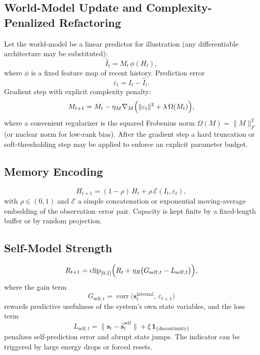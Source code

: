 \documentclass[11pt,a4paper]{article}
\begin{document}
\subsection{World-Model Update and Complexity-Penalized Refactoring}

Let the world-model be a linear predictor for illustration (any differentiable architecture may be substituted):
\begin{equation}
  \widehat{I}_t = M_t\, \phi(H_t),
\end{equation}
where \(\phi\) is a fixed feature map of recent history. Prediction error
\begin{equation}
  \varepsilon_t = I_t - \widehat{I}_t.
\end{equation}
Gradient step with explicit complexity penalty:
\begin{equation}
  M_{t+1} = M_t - \eta_M \nabla_M\Bigl( \|\varepsilon_t\|^2 + \lambda\, \Omega(M_t) \Bigr),
  \label{eq:model}
\end{equation}
where a convenient regularizer is the squared Frobenius norm \(\Omega(M) = \|M\|_F^2\) (or nuclear norm for low-rank bias). After the gradient step a hard truncation or soft-thresholding step may be applied to enforce an explicit parameter budget.

\subsection{Memory Encoding}

\begin{equation}
  H_{t+1} = (1-\rho)\, H_t + \rho\, \mathcal{E}(I_t,\varepsilon_t),
  \label{eq:mem}
\end{equation}
with \(\rho \in (0,1)\) and \(\mathcal{E}\) a simple concatenation or exponential moving-average embedding of the observation--error pair. Capacity is kept finite by a fixed-length buffer or by random projection.

\subsection{Self-Model Strength}

\begin{equation}
  R_{t+1} = \operatorname{clip}_{[0,1]}\Bigl(
    R_t + \eta_R\bigl( G_{\mathrm{self},t} - L_{\mathrm{self},t} \bigr)
  \Bigr),
  \label{eq:self}
\end{equation}
where the gain term
\begin{equation}
  G_{\mathrm{self},t} = \operatorname{corr}\bigl( \mathbf{s}_t^{\mathrm{internal}},\, \varepsilon_{t+1} \bigr)
\end{equation}
rewards predictive usefulness of the system's own state variables, and the loss term
\begin{equation}
  L_{\mathrm{self},t} = \| \mathbf{s}_t - \widehat{\mathbf{s}}_t^{\mathrm{self}} \| + \xi\, \mathbf{1}_{\{\text{discontinuity}\}}
\end{equation}
penalizes self-prediction error and abrupt state jumps. The indicator can be triggered by large energy drops or forced resets.
\end{document}

